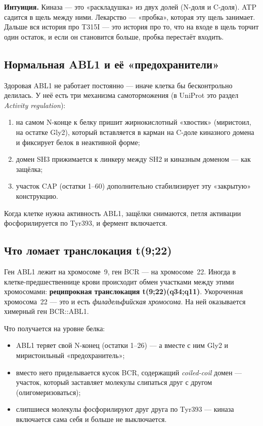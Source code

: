 \documentclass[11pt,a4paper]{article}
\newcommand{\code}[1]{{\ttfamily #1}}
\begin{document}
\begin{note}
\textbf{Интуиция.} Киназа --- это «раскладушка» из двух долей (N-доля и C-доля).
ATP садится в щель между ними. Лекарство --- «пробка», которая эту щель занимает.
Дальше вся история про T315I --- это история про то, что на входе в щель торчит
один остаток, и если он становится больше, пробка перестаёт входить.
\end{note}

\subsection{Нормальная ABL1 и её «предохранители»}

Здоровая ABL1 не работает постоянно --- иначе клетка бы бесконтрольно делилась.
У неё есть три механизма самоторможения (в UniProt это раздел
\emph{Activity regulation}):
\begin{enumerate}[leftmargin=*,topsep=2pt,itemsep=2pt]
\item на самом N-конце к белку пришит жирнокислотный «хвостик» (миристоил,
на остатке Gly2), который вставляется в карман на C-доле киназного домена и
фиксирует белок в неактивной форме;
\item домен SH3 прижимается к линкеру между SH2 и киназным доменом --- как
защёлка;
\item участок CAP (остатки 1--60) дополнительно стабилизирует эту «закрытую»
конструкцию.
\end{enumerate}
Когда клетке нужна активность ABL1, защёлки снимаются, петля активации
фосфорилируется по Tyr393, и фермент включается.

\subsection{Что ломает транслокация t(9;22)}

Ген \code{ABL1} лежит на хромосоме~9, ген \code{BCR} --- на хромосоме~22. Иногда
в клетке-предшественнице крови происходит обмен участками между этими хромосомами:
\textbf{реципрокная транслокация t(9;22)(q34;q11)}. Укороченная хромосома~22 ---
это и есть \emph{филадельфийская хромосома}. На ней оказывается химерный ген
\code{BCR::ABL1}.

Что получается на уровне белка:
\begin{itemize}[leftmargin=*,topsep=2pt,itemsep=2pt]
\item ABL1 теряет свой N-конец (остатки 1--26) --- а вместе с ним Gly2 и
миристоильный «предохранитель»;
\item вместо него приделывается кусок BCR, содержащий \emph{coiled-coil} домен ---
участок, который заставляет молекулы слипаться друг с другом (олигомеризоваться);
\item слипшиеся молекулы фосфорилируют друг друга по Tyr393 --- киназа включается
сама себя и больше не выключается.
\end{itemize}
\end{document}
